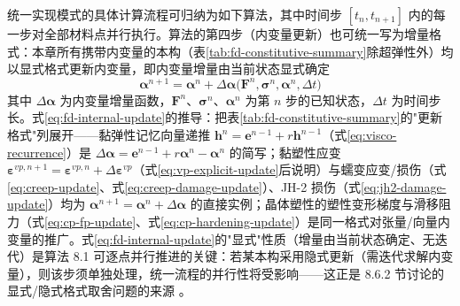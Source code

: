 统一实现模式的具体计算流程可归纳为如下算法，其中时间步 $[t_{n},t_{n+1}]$ 内的每一步对全部材料点并行执行。算法的第四步（内变量更新）也可统一写为增量格式：本章所有携带内变量的本构（表\ref{tab:fd-constitutive-summary}除超弹性外）均以显式格式更新内变量，即内变量增量由当前状态显式确定
\begin{equation}
  \boldsymbol{\alpha}^{n+1}
  =\boldsymbol{\alpha}^{n}+\Delta\boldsymbol{\alpha}\bigl(\mathbf{F}^{n},\boldsymbol{\sigma}^{n},\boldsymbol{\alpha}^{n},\Delta t\bigr)
  \label{eq:fd-internal-update}
\end{equation}
其中 $\Delta\boldsymbol{\alpha}$ 为内变量增量函数，$\mathbf{F}^{n}$、$\boldsymbol{\sigma}^{n}$、$\boldsymbol{\alpha}^{n}$ 为第 $n$ 步的已知状态，$\Delta t$ 为时间步长。式\eqref{eq:fd-internal-update}的推导：把表\ref{tab:fd-constitutive-summary}的"更新格式"列展开——黏弹性记忆向量递推 $\mathbf{h}^{n}=\mathbf{e}^{n-1}+r\mathbf{h}^{n-1}$（式\eqref{eq:visco-recurrence}）是 $\Delta\boldsymbol{\alpha}=\mathbf{e}^{n-1}+r\boldsymbol{\alpha}^{n}-\boldsymbol{\alpha}^{n}$ 的简写；黏塑性应变 $\boldsymbol{\varepsilon}^{vp,n+1}=\boldsymbol{\varepsilon}^{vp,n}+\Delta\boldsymbol{\varepsilon}^{vp}$（式\eqref{eq:vp-explicit-update}后说明）与蠕变应变/损伤（式\eqref{eq:creep-update}、式\eqref{eq:creep-damage-update}）、JH-2 损伤（式\eqref{eq:jh2-damage-update}）均为 $\boldsymbol{\alpha}^{n+1}=\boldsymbol{\alpha}^{n}+\Delta\boldsymbol{\alpha}$ 的直接实例；晶体塑性的塑性变形梯度与滑移阻力（式\eqref{eq:cp-fp-update}、式\eqref{eq:cp-hardening-update}）是同一格式对张量/向量内变量的推广。式\eqref{eq:fd-internal-update}的"显式"性质（增量由当前状态确定、无迭代）是算法 8.1 可逐点并行推进的关键：若某本构采用隐式更新（需迭代求解内变量），则该步须单独处理，统一流程的并行性将受影响——这正是 8.6.2 节讨论的显式/隐式格式取舍问题的来源 \cite{Foster2010,SimoHughes1998}。

